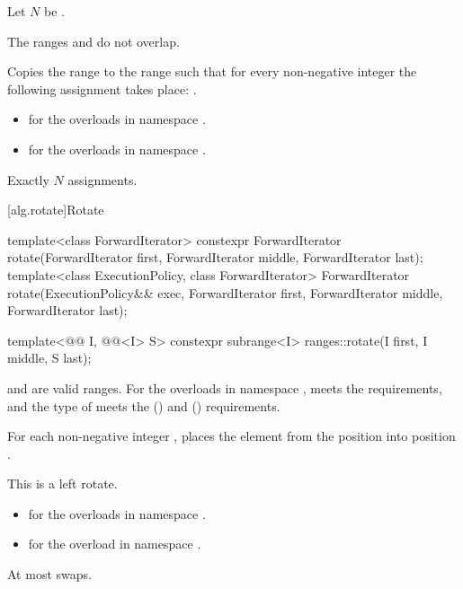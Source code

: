 \begin{itemdescr}
\pnum
Let $N$ be .

\pnum
\expects
The ranges  and 
do not overlap.

\pnum
\effects
Copies the range  to the range 
such that for every non-negative integer 
the following assignment takes place:
.

\pnum
\returns
\begin{itemize}
\item
   for the overloads in namespace .
\item
   for the overloads in namespace .
\end{itemize}

\pnum
\complexity
Exactly $N$ assignments.
\end{itemdescr}

[alg.rotate]{Rotate}

%
\begin{itemdecl}
template<class ForwardIterator>
  constexpr ForwardIterator
    rotate(ForwardIterator first, ForwardIterator middle, ForwardIterator last);
template<class ExecutionPolicy, class ForwardIterator>
  ForwardIterator
    rotate(ExecutionPolicy&& exec,
           ForwardIterator first, ForwardIterator middle, ForwardIterator last);

template<@@ I, @@<I> S>
  constexpr subrange<I> ranges::rotate(I first, I middle, S last);
\end{itemdecl}

\begin{itemdescr}
\pnum
\expects
{} and  are valid ranges.
For the overloads in namespace ,
 meets
the  requirements, and
the type of  meets
the  () and
 () requirements.

\pnum
\effects
For each non-negative integer ,
places the element from the position 
into position .
\begin{note}
This is a left rotate.
\end{note}

\pnum
\returns
\begin{itemize}
\item
  for the overloads in namespace .
\item
  for the overload in namespace .
\end{itemize}

\pnum
\complexity
At most  swaps.
\end{itemdescr}

